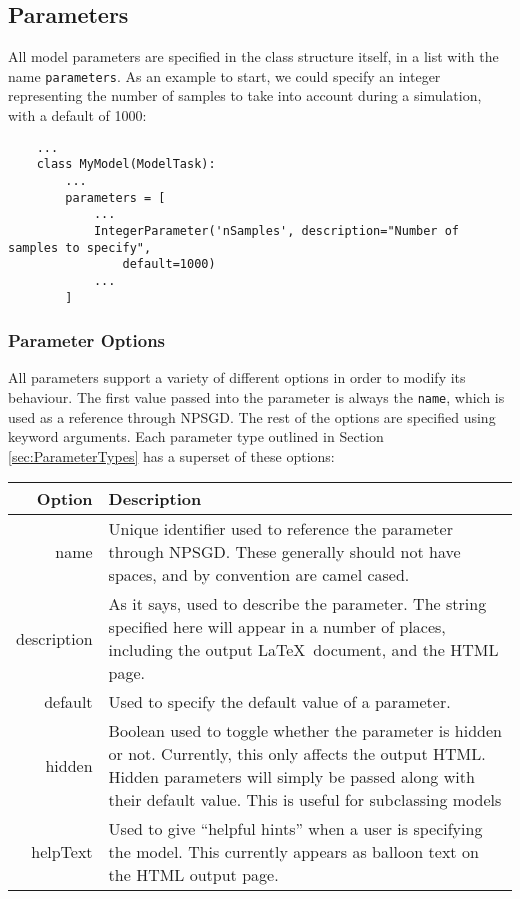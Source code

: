 \documentclass{article}
\newcommand{\mpath}[1]{\texttt{#1}}
\begin{document}
\subsection{Parameters}
All model parameters are specified in
the class structure itself, in a list with the name \mpath{parameters}. As an
example to start, we could specify an integer representing the number of samples
to take into account during a simulation, with a default of 1000:
\begin{lstlisting}
    ...
    class MyModel(ModelTask):
        ...
        parameters = [
            ...
            IntegerParameter('nSamples', description="Number of samples to specify",
                default=1000)
            ...
        ]

\end{lstlisting}

\subsubsection{Parameter Options}
All parameters support a variety of different options in order to modify its
behaviour. The first value passed into the parameter is always the
\texttt{name}, which is used as a reference through NPSGD. The rest of the
options are specified using keyword arguments. Each parameter type outlined in
Section \ref{sec:ParameterTypes} has a superset of these options:\\
\begin{tabular}{ r p{4in} }
    \textbf{Option} & \textbf{Description} \\
    \hline
    name & Unique identifier used to reference the parameter through NPSGD.
           These generally should not have spaces, and by convention are camel
           cased. \\
    description & As it says, used to describe the parameter. The string
                  specified here will appear in a number of places, including
                  the output \LaTeX\ document, and the HTML page. \\
    default & Used to specify the default value of a parameter. \\
    hidden  & Boolean used to toggle whether the parameter is hidden or not.
              Currently, this only affects the output HTML. Hidden parameters will simply
              be passed along with their default value. This is useful for
              subclassing models\\
    helpText & Used to give ``helpful hints'' when a user is specifying the
               model. This currently appears as balloon text on the HTML output
               page.
\end{tabular}
\end{document}
